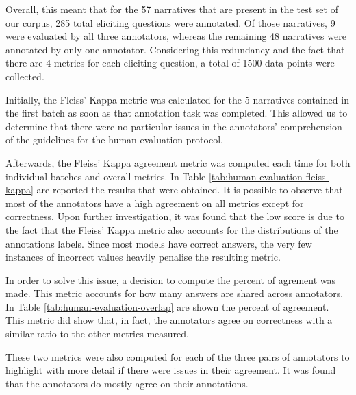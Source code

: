 Overall, this meant that for the 57 narratives that are present in the test set of our corpus, 285 total eliciting questions were annotated. Of those narratives, 9 were evaluated by all three annotators, whereas the remaining 48 narratives were annotated by only one annotator. Considering this redundancy and the fact that there are 4 metrics for each eliciting question, a total of 1500 data points were collected.


Initially, the Fleiss' Kappa \cite{fleiss} metric was calculated for the 5 narratives contained in the first batch as soon as that annotation task was completed. This allowed us to determine that there were no particular issues in the annotators' comprehension of the guidelines for the human evaluation protocol.


Afterwards, the Fleiss' Kappa agreement metric was computed each time for both individual batches and overall metrics. In Table \ref{tab:human-evaluation-fleiss-kappa} are reported the results that were obtained. It is possible to observe that most of the annotators have a high agreement on all metrics except for correctness. Upon further investigation, it was found that the low score is due to the fact that the Fleiss' Kappa metric also accounts for the distributions of the annotations labels. Since most models have correct answers, the very few instances of incorrect values heavily penalise the resulting metric.

In order to solve this issue, a decision to compute the percent of agrement was made. This metric accounts for how many answers are shared across annotators. In Table \ref{tab:human-evaluation-overlap} are shown the percent of agreement. This metric did show that, in fact, the annotators agree on correctness with a similar ratio to the other metrics measured. 




These two metrics were also computed for each of the three pairs of annotators to highlight with more detail if there were issues in their agreement. 
% 
% 
It was found that the annotators do mostly agree on their annotations.

